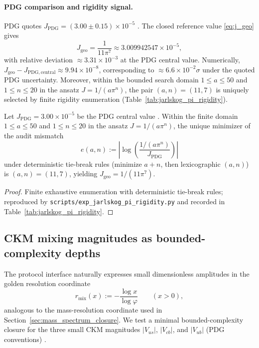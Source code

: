 \paragraph{PDG comparison and rigidity signal.}
PDG quotes $J_{\mathrm{PDG}}=(3.00\pm 0.15)\times 10^{-5}$ \cite{PDGRPP2024}.
The closed reference value \eqref{eq:j_geo} gives
\begin{equation}\label{eq:j_geo_numeric}
J_{\mathrm{geo}}=\frac{1}{11\pi^7}\approx 3.009942547\times 10^{-5},
\end{equation}
with relative deviation $\approx 3.31\times 10^{-3}$ at the PDG central value.
Numerically, $J_{\mathrm{geo}}-J_{\mathrm{PDG,central}}\approx 9.94\times 10^{-8}$, corresponding to $\approx 6.6\times 10^{-2}\sigma$ under the quoted PDG uncertainty.
Moreover, within the bounded search domain $1\le a\le 50$ and $1\le n\le 20$ in the ansatz $J=1/(a\pi^n)$, the pair $(a,n)=(11,7)$ is uniquely selected by finite rigidity enumeration (Table~\ref{tab:jarlskog_pi_rigidity}).
\begin{proposition}\label{prop:jarlskog_rigidity_stmt}
Let $J_{\mathrm{PDG}}=3.00\times 10^{-5}$ be the PDG central value \cite{PDGRPP2024}.
Within the finite domain $1\le a\le 50$ and $1\le n\le 20$ in the ansatz $J=1/(a\pi^n)$, the unique minimizer of the audit mismatch
\[
e(a,n):=\left|\log\!\left(\frac{1/(a\pi^n)}{J_{\mathrm{PDG}}}\right)\right|
\]
under deterministic tie-break rules (minimize $a+n$, then lexicographic $(a,n)$) is $(a,n)=(11,7)$, yielding $J_{\mathrm{geo}}=1/(11\pi^7)$.
\end{proposition}
\begin{proof}
Finite exhaustive enumeration with deterministic tie-break rules; reproduced by \texttt{scripts/exp\_jarlskog\_pi\_rigidity.py} and recorded in Table~\ref{tab:jarlskog_pi_rigidity}.
\end{proof}

\subsection{CKM mixing magnitudes as bounded-complexity depths}
\label{subsec:ckm_mixing_depths}

The protocol interface naturally expresses small dimensionless amplitudes in the golden resolution coordinate
\begin{equation}\label{eq:r_mix_def}
r_{\mathrm{mix}}(x):=-\frac{\log x}{\log\varphi}\qquad(x>0),
\end{equation}
analogous to the mass-resolution coordinate used in Section~\ref{sec:mass_spectrum_closure}.
We test a minimal bounded-complexity closure for the three small CKM magnitudes $|V_{us}|$, $|V_{cb}|$, and $|V_{ub}|$ (PDG conventions) \cite{PDGRPP2024}.

